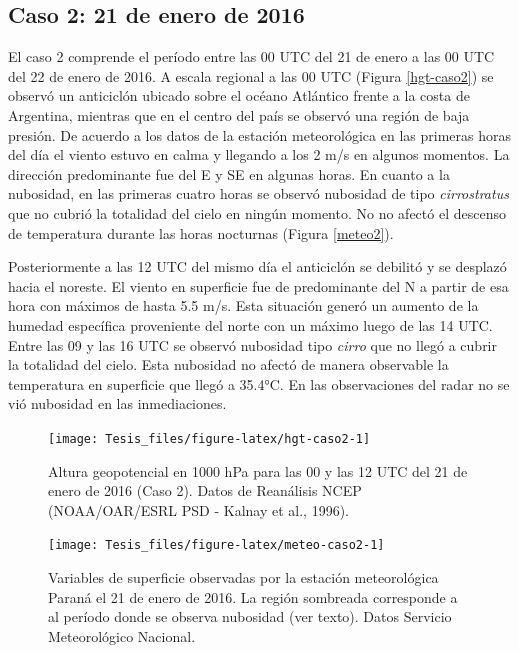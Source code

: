 \documentclass[12pt,spanish,oneside]{book}
\begin{document}
\subsection{Caso 2: 21 de enero de
2016}\label{caso-2-21-de-enero-de-2016}

El caso 2 comprende el período entre las 00 UTC del 21 de enero a las 00
UTC del 22 de enero de 2016. A escala regional a las 00 UTC (Figura
\ref{hgt-caso2}) se observó un anticiclón ubicado sobre el océano
Atlántico frente a la costa de Argentina, mientras que en el centro del
país se observó una región de baja presión. De acuerdo a los datos de la
estación meteorológica en las primeras horas del día el viento estuvo en
calma y llegando a los 2 m/s en algunos momentos. La dirección
predominante fue del E y SE en algunas horas. En cuanto a la nubosidad,
en las primeras cuatro horas se observó nubosidad de tipo
\emph{cirrostratus} que no cubrió la totalidad del cielo en ningún
momento. No no afectó el descenso de temperatura durante las horas
nocturnas (Figura \ref{meteo2}).

Posteriormente a las 12 UTC del mismo día el anticiclón se debilitó y se
desplazó hacia el noreste. El viento en superficie fue de predominante
del N a partir de esa hora con máximos de hasta 5.5 m/s. Esta situación
generó un aumento de la humedad específica proveniente del norte con un
máximo luego de las 14 UTC. Entre las 09 y las 16 UTC se observó
nubosidad tipo \emph{cirro} que no llegó a cubrir la totalidad del
cielo. Esta nubosidad no afectó de manera observable la temperatura en
superficie que llegó a 35.4°C. En las observaciones del radar no se vió
nubosidad en las inmediaciones.

\begin{figure}

{\centering \texttt{[image: Tesis\_files/figure-latex/hgt-caso2-1]} 

}

\caption{Altura geopotencial en 1000 hPa para las 00 y las 12 UTC del 21 de enero de 2016 (Caso 2). Datos de Reanálisis NCEP (NOAA/OAR/ESRL PSD - Kalnay et al., 1996). \label{hgt-caso2}}\label{fig:hgt-caso2}
\end{figure}

\begin{figure}

{\centering \texttt{[image: Tesis\_files/figure-latex/meteo-caso2-1]} 

}

\caption{Variables de superficie observadas por la estación meteorológica Paraná el 21 de enero de 2016. La región sombreada corresponde a al período donde se observa nubosidad (ver texto). Datos Servicio Meteorológico Nacional. \label{meteo2}}\label{fig:meteo-caso2}
\end{figure}
\end{document}
